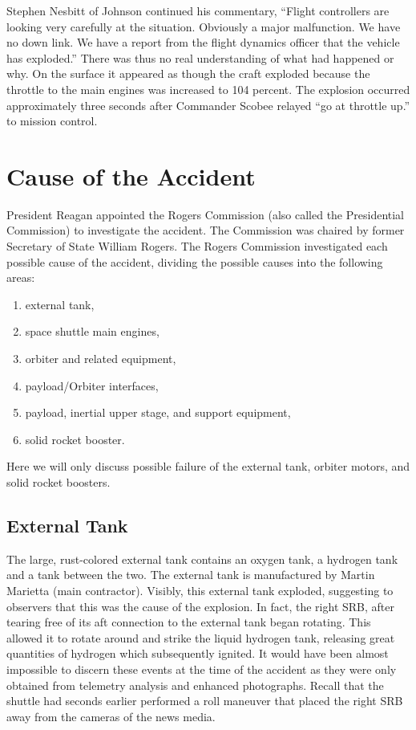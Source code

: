 Stephen Nesbitt of Johnson continued his commentary, ``Flight controllers are looking very carefully at the situation. Obviously a major malfunction. We have no down link. We have a report from the flight dynamics officer that the vehicle has exploded.'' There was thus no real understanding of what had happened or why. On the surface it appeared as though the craft exploded because the throttle to the main engines was increased to 104 percent. The explosion occurred approximately three seconds after Commander Scobee relayed ``go at throttle up.'' to mission control.

\section{Cause of the Accident}

President Reagan appointed the Rogers Commission (also called the Presidential Commission) to investigate the accident. The Commission was chaired by former Secretary of State William Rogers. The Rogers Commission investigated each possible cause of the accident, dividing the possible causes into the following areas:

\begin{singlespace}
\begin{enumerate}
\item external tank,
\item space shuttle main engines,
\item orbiter and related equipment,
\item payload/Orbiter interfaces,
\item payload, inertial upper stage, and support equipment,
\item solid rocket booster.
\end{enumerate}
\end{singlespace}

Here we will only discuss possible failure of the external tank, orbiter motors, and solid rocket boosters.

\subsection{External Tank}

The large, rust-colored external tank contains an oxygen tank, a hydrogen tank and a tank between the two. The external tank is manufactured by Martin Marietta (main contractor). Visibly, this external tank exploded, suggesting to observers that this was the cause of the explosion. In fact, the right SRB, after tearing free of its aft connection to the external tank began rotating. This allowed it to rotate around and strike the liquid hydrogen tank, releasing great quantities of hydrogen which subsequently ignited. It would have been almost impossible to discern these events at the time of the accident as they were only obtained from telemetry analysis and enhanced photographs. Recall that the shuttle had seconds earlier performed a roll maneuver that placed the right SRB away from the cameras of the news media.

